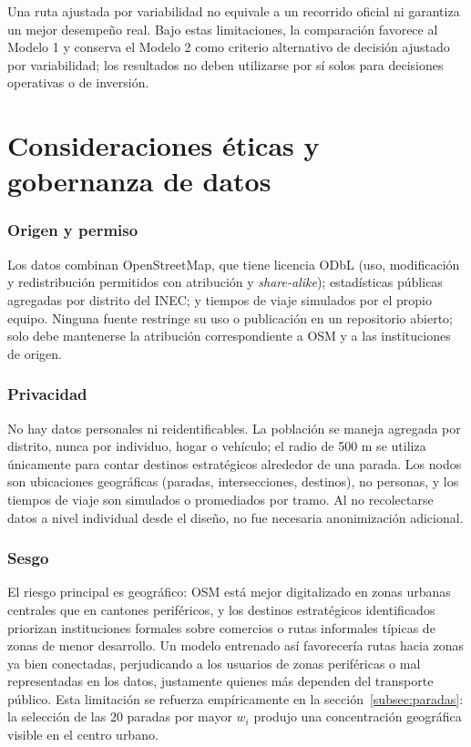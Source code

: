 \documentclass[11pt]{article}
\numberwithin{equation}{section}
\begin{document}
Una ruta ajustada por variabilidad no equivale a un recorrido oficial ni garantiza un mejor desempeño real. Bajo estas limitaciones, la comparación favorece al Modelo 1 y conserva el Modelo 2 como criterio alternativo de decisión ajustado por variabilidad; los resultados no deben utilizarse por sí solos para decisiones operativas o de inversión.

\section{Consideraciones éticas y gobernanza de datos}\label{sec:etica}

\subsubsection*{Origen y permiso}

Los datos combinan OpenStreetMap, que tiene licencia ODbL (uso, modificación y redistribución permitidos con atribución y \textit{share-alike}); estadísticas públicas agregadas por distrito del INEC; y tiempos de viaje simulados por el propio equipo. Ninguna fuente restringe su uso o publicación en un repositorio abierto; solo debe mantenerse la atribución correspondiente a OSM y a las instituciones de origen.

\subsubsection*{Privacidad}

No hay datos personales ni reidentificables. La población se maneja agregada por distrito, nunca por individuo, hogar o vehículo; el radio de 500 m se utiliza únicamente para contar destinos estratégicos alrededor de una parada. Los nodos son ubicaciones geográficas (paradas, intersecciones, destinos), no personas, y los tiempos de viaje son simulados o promediados por tramo. Al no recolectarse datos a nivel individual desde el diseño, no fue necesaria anonimización adicional.

\subsubsection*{Sesgo}

El riesgo principal es geográfico: OSM está mejor digitalizado en zonas urbanas centrales que en cantones periféricos, y los destinos estratégicos identificados priorizan instituciones formales sobre comercios o rutas informales típicas de zonas de menor desarrollo. Un modelo entrenado así favorecería rutas hacia zonas ya bien conectadas, perjudicando a los usuarios de zonas periféricas o mal representadas en los datos, justamente quienes más dependen del transporte público. Esta limitación se refuerza empíricamente en la sección~\ref{subsec:paradas}: la selección de las 20 paradas por mayor $w_i$ produjo una concentración geográfica visible en el centro urbano.
\end{document}
